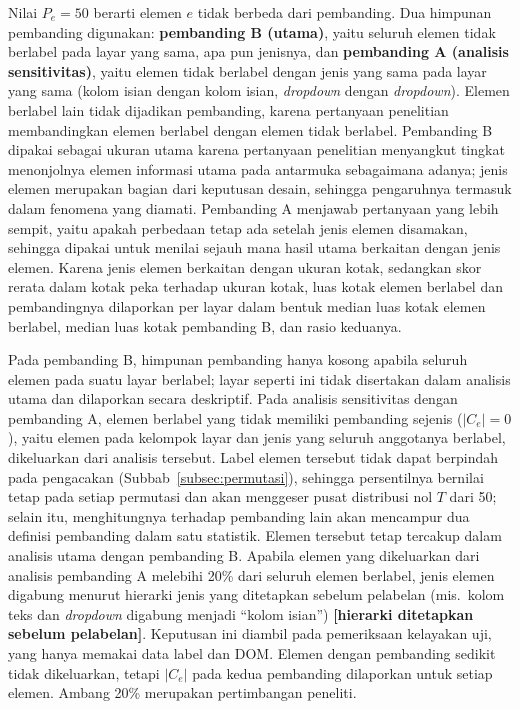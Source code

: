 Nilai $P_e = 50$ berarti elemen $e$ tidak berbeda dari pembanding. Dua himpunan pembanding digunakan: \textbf{pembanding B (utama)}, yaitu seluruh elemen tidak berlabel pada layar yang sama, apa pun jenisnya, dan \textbf{pembanding A (analisis sensitivitas)}, yaitu elemen tidak berlabel dengan jenis yang sama pada layar yang sama (kolom isian dengan kolom isian, \emph{dropdown} dengan \emph{dropdown}). Elemen berlabel lain tidak dijadikan pembanding, karena pertanyaan penelitian membandingkan elemen berlabel dengan elemen tidak berlabel. Pembanding B dipakai sebagai ukuran utama karena pertanyaan penelitian menyangkut tingkat menonjolnya elemen informasi utama pada antarmuka sebagaimana adanya; jenis elemen merupakan bagian dari keputusan desain, sehingga pengaruhnya termasuk dalam fenomena yang diamati. Pembanding A menjawab pertanyaan yang lebih sempit, yaitu apakah perbedaan tetap ada setelah jenis elemen disamakan, sehingga dipakai untuk menilai sejauh mana hasil utama berkaitan dengan jenis elemen. Karena jenis elemen berkaitan dengan ukuran kotak, sedangkan skor rerata dalam kotak peka terhadap ukuran kotak, luas kotak elemen berlabel dan pembandingnya dilaporkan per layar dalam bentuk median luas kotak elemen berlabel, median luas kotak pembanding B, dan rasio keduanya.

Pada pembanding B, himpunan pembanding hanya kosong apabila seluruh elemen pada suatu layar berlabel; layar seperti ini tidak disertakan dalam analisis utama dan dilaporkan secara deskriptif. Pada analisis sensitivitas dengan pembanding A, elemen berlabel yang tidak memiliki pembanding sejenis ($|C_e| = 0$), yaitu elemen pada kelompok layar dan jenis yang seluruh anggotanya berlabel, dikeluarkan dari analisis tersebut. Label elemen tersebut tidak dapat berpindah pada pengacakan (Subbab~\ref{subsec:permutasi}), sehingga persentilnya bernilai tetap pada setiap permutasi dan akan menggeser pusat distribusi nol $T$ dari 50; selain itu, menghitungnya terhadap pembanding lain akan mencampur dua definisi pembanding dalam satu statistik. Elemen tersebut tetap tercakup dalam analisis utama dengan pembanding B. Apabila elemen yang dikeluarkan dari analisis pembanding A melebihi 20\% dari seluruh elemen berlabel, jenis elemen digabung menurut hierarki jenis yang ditetapkan sebelum pelabelan (mis.\ kolom teks dan \emph{dropdown} digabung menjadi ``kolom isian'') \textbf{[hierarki ditetapkan sebelum pelabelan]}. Keputusan ini diambil pada pemeriksaan kelayakan uji, yang hanya memakai data label dan DOM. Elemen dengan pembanding sedikit tidak dikeluarkan, tetapi $|C_e|$ pada kedua pembanding dilaporkan untuk setiap elemen. Ambang 20\% merupakan pertimbangan peneliti.

